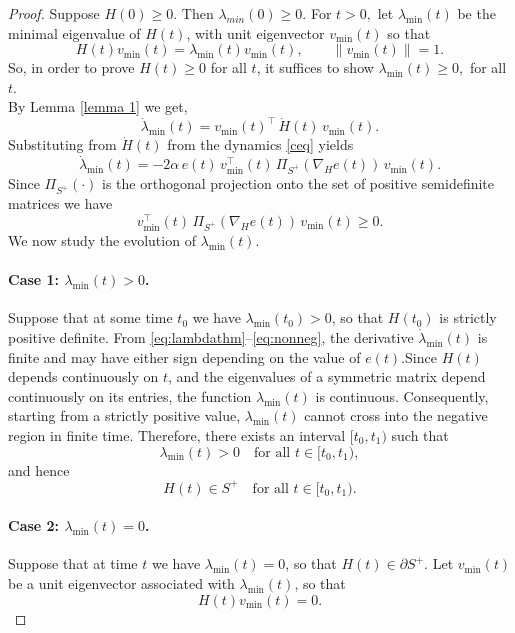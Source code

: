 \documentclass[10pt,a4paper]{amsart}
\begin{document}
\begin{proof} Suppose $H(0) \geq 0.$ Then   $  \lambda_{min}(0) \geq 0.$ For $t>0 ,$ let $\lambda_{\min}(t)$ be the minimal eigenvalue of $H(t)$, with unit eigenvector
$v_{\min}(t)$ so that
\[
H(t)v_{\min}(t)=\lambda_{\min}(t)v_{\min}(t), 
\qquad \|v_{\min}(t)\|=1.
\] So, in order to prove $H(t)\geq 0$ for all $t$, it suffices to show  $\lambda_{\min}(t) \geq 0,$ for all $t.$\\
 By Lemma \eqref{lemma 1} we get,
\begin{equation}
\dot\lambda_{\min}(t)
= v_{\min}(t)^{\!\top}\, \dot H(t)\, v_{\min}(t).
\label{eq:lambdaderivative}
\end{equation}
Substituting from $\dot H(t)$ from the dynamics \eqref{ceq} yields
\begin{equation}
\dot\lambda_{\min}(t)
= -2\alpha\, e(t)\,
v_{\min}^{\!\top}(t)\, 
\Pi_{S^+}(\nabla_H e(t))\, 
v_{\min}(t).
\label{eq:lambdathm}
\end{equation}
Since $\Pi_{S^+}(\cdot)$ is the orthogonal projection onto the set of positive semidefinite matrices we have
\begin{equation}
v_{\min}^{\!\top}(t)\,
\Pi_{S^+}(\nabla_H e(t))\,
v_{\min}(t)
\ge 0.
\label{eq:nonneg}
\end{equation}
We now study the evolution of $\lambda_{\min}(t)$.\\

\paragraph{Case 1: $\lambda_{\min}(t) > 0$.}
Suppose that at some time $t_0$ we have $\lambda_{\min}(t_0) > 0$, so that $H(t_0)$ is strictly positive definite.  
From \eqref{eq:lambdathm}--\eqref{eq:nonneg}, the derivative $\dot{\lambda}_{\min}(t)$ is finite and may have either sign depending on the value of $e(t)$.Since $H(t)$ depends continuously on $t$, and the eigenvalues of a symmetric matrix depend continuously on its entries, the function $\lambda_{\min}(t)$ is continuous. Consequently, starting from a strictly positive value, $\lambda_{\min}(t)$ cannot cross into the negative region in finite time. Therefore, there exists an interval $[t_0,t_1)$ such that
\[
\lambda_{\min}(t) > 0 \quad \text{for all } t \in [t_0,t_1),
\]
and hence
\[
H(t) \in S^+ \quad \text{for all } t \in [t_0,t_1).
\]
 
\paragraph{Case 2: $\lambda_{\min}(t) = 0$.}
Suppose that at time $t$ we have $\lambda_{\min}(t)=0$, so that
$H(t)\in \partial S^+$. Let $v_{\min}(t)$ be a unit eigenvector
associated with $\lambda_{\min}(t)$, so that
\[
H(t)v_{\min}(t)=0.
\]


\end{proof}
\end{document}
